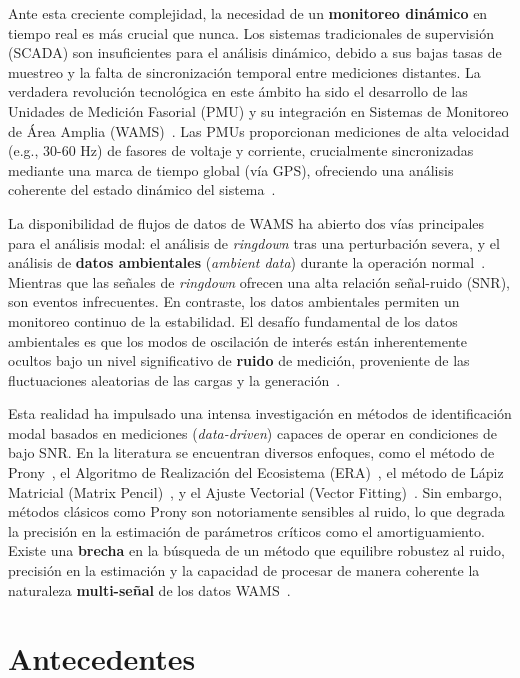 Ante esta creciente complejidad, la necesidad de un \textbf{monitoreo dinámico} en tiempo real es más 
crucial que nunca. Los sistemas tradicionales de supervisión (SCADA) son insuficientes para el análisis 
dinámico, debido a sus bajas tasas de muestreo y la falta de sincronización temporal entre mediciones 
distantes. La verdadera revolución tecnológica en este ámbito ha sido el desarrollo de las Unidades de 
Medición Fasorial (PMU) y su integración en Sistemas de Monitoreo de Área Amplia 
(WAMS)~\cite{5}. Las PMUs proporcionan mediciones de alta velocidad (e.g., 30-60 Hz) de 
fasores de voltaje y corriente, crucialmente sincronizadas mediante una marca de tiempo global (vía GPS),
 ofreciendo una análisis coherente del estado dinámico del sistema~\cite{3}.

La disponibilidad de flujos de datos de WAMS ha abierto dos vías principales para el análisis modal: 
el análisis de \textit{ringdown} tras una perturbación severa, y el análisis de \textbf{datos ambientales} 
(\textit{ambient data}) durante la operación normal~\cite{4, 8}. Mientras que las 
señales de \textit{ringdown} ofrecen una alta relación señal-ruido (SNR), son eventos infrecuentes. 
En contraste, los datos ambientales permiten un monitoreo continuo de la estabilidad. 
El desafío fundamental de los datos ambientales es que los modos de oscilación de interés están 
inherentemente ocultos bajo un nivel significativo de \textbf{ruido}  de medición, 
proveniente de las fluctuaciones aleatorias de las cargas y la generación~\cite{1}.

Esta realidad ha impulsado una intensa investigación en métodos de identificación modal basados en 
mediciones (\textit{data-driven}) capaces de operar en condiciones de bajo SNR. En la literatura se 
encuentran diversos enfoques, como el método de Prony~\cite{6, 9}, el Algoritmo 
de Realización del Ecosistema (ERA)~\cite{7, 6}, el método de Lápiz Matricial 
(Matrix Pencil)~\cite{6}, y el Ajuste Vectorial (Vector Fitting)~\cite{5}. 
Sin embargo, métodos clásicos como Prony son notoriamente sensibles al ruido, lo que degrada la precisión
 en la estimación de parámetros críticos como el amortiguamiento. Existe una \textbf{brecha} en la 
 búsqueda de un método que equilibre robustez al ruido, precisión en la estimación y la capacidad de 
 procesar de manera coherente la naturaleza \textbf{multi-señal} de los datos WAMS~\cite{10}.



 \section{Antecedentes} 



